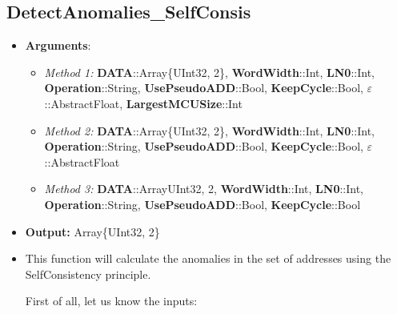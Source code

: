 \subsection*{DetectAnomalies\_SelfConsis}
\begin{itemize}
	\item \textbf{Arguments}:
	\begin{itemize}
		\item  \textit{Method 1: }\textbf{DATA}::Array\{UInt32, 2\}, 
		\textbf{WordWidth}::Int,
		\textbf{LN0}::Int,
		\textbf{Operation}::String,
		\textbf{UsePseudoADD}::Bool,
		\textbf{KeepCycle}::Bool,
		\textbf{\(\varepsilon\)}::AbstractFloat,
		\textbf{LargestMCUSize}::Int
		\item  \textit{Method 2: }\textbf{DATA}::Array\{UInt32, 2\}, 
		\textbf{WordWidth}::Int,
		\textbf{LN0}::Int,
		\textbf{Operation}::String,
		\textbf{UsePseudoADD}::Bool,
		\textbf{KeepCycle}::Bool,
		\textbf{\(\varepsilon\)}::AbstractFloat
		\item  \textit{Method 3: }\textbf{DATA}::Array{UInt32, 2}, 
		\textbf{WordWidth}::Int,
		\textbf{LN0}::Int,
		\textbf{Operation}::String,
		\textbf{UsePseudoADD}::Bool,
		\textbf{KeepCycle}::Bool
	\end{itemize}
	\item \textbf{Output: } Array\{UInt32, 2\}	
	\item This function will calculate the anomalies in the set of addresses using the SelfConsistency principle.

	 First of all, let us know the inputs:
	 \begin{itemize}
	

\end{itemize}
\end{itemize}
